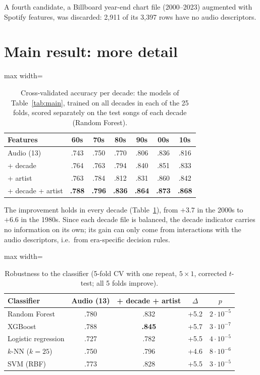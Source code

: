 A fourth candidate, a Billboard year-end chart file (2000--2023) augmented with Spotify
features, was discarded: 2{,}911 of its 3{,}397 rows have no audio descriptors.

\FloatBarrier
\section{Main result: more detail}\label{app:main}
\begin{table}[!htbp]
\centering
\caption{Cross-validated accuracy per decade: the models of Table~\ref{tab:main}, trained on all decades in each
of the 25 folds, scored separately on the test songs of each decade (Random Forest).}
\label{tab:decade}
\footnotesize
\setlength{\tabcolsep}{3.2pt}
\begin{adjustbox}{max width=\columnwidth}
\begin{tabular}{@{}lcccccc@{}}
\toprule
Features & 60s & 70s & 80s & 90s & 00s & 10s \\
\midrule
Audio (13) & .743 & .750 & .770 & .806 & .836 & .816 \\
+ decade & .764 & .763 & .794 & .840 & .851 & .833 \\
+ artist & .763 & .784 & .812 & .831 & .860 & .842 \\
+ decade + artist & \textbf{.788} & \textbf{.796} & \textbf{.836} & \textbf{.864} & \textbf{.873} & \textbf{.868} \\
\bottomrule
\end{tabular}
\end{adjustbox}
\end{table}

The improvement holds in every decade (Table~\ref{tab:decade}), from $+3.7$\pp{} in the
2000s to $+6.6$\pp{} in the 1980s. Since each decade file is balanced, the decade indicator
carries no information on its own; its gain can only come from interactions with the audio
descriptors, i.e.\ from era-specific decision rules.

\begin{table}[!htbp]
\centering
\caption{Robustness to the classifier (5-fold CV with one repeat, $5{\times}1$, corrected $t$-test; all 5 folds
improve).}
\label{tab:models}
\footnotesize
\setlength{\tabcolsep}{3pt}
\begin{adjustbox}{max width=\columnwidth}
\begin{tabular}{@{}lcccc@{}}
\toprule
Classifier & Audio (13) & + decade + artist & $\Delta$ & $p$ \\
\midrule
Random Forest~\cite{breiman2001random} & .780 & .832 & +5.2 & $2{\cdot}10^{-5}$ \\
XGBoost~\cite{chen2016xgboost} & .788 & \textbf{.845} & +5.7 & $3{\cdot}10^{-7}$ \\
Logistic regression & .727 & .782 & +5.5 & $4{\cdot}10^{-5}$ \\
$k$-NN ($k=25$) & .750 & .796 & +4.6 & $8{\cdot}10^{-6}$ \\
SVM (RBF) & .773 & .828 & +5.5 & $3{\cdot}10^{-5}$ \\
\bottomrule
\end{tabular}
\end{adjustbox}
\end{table}

